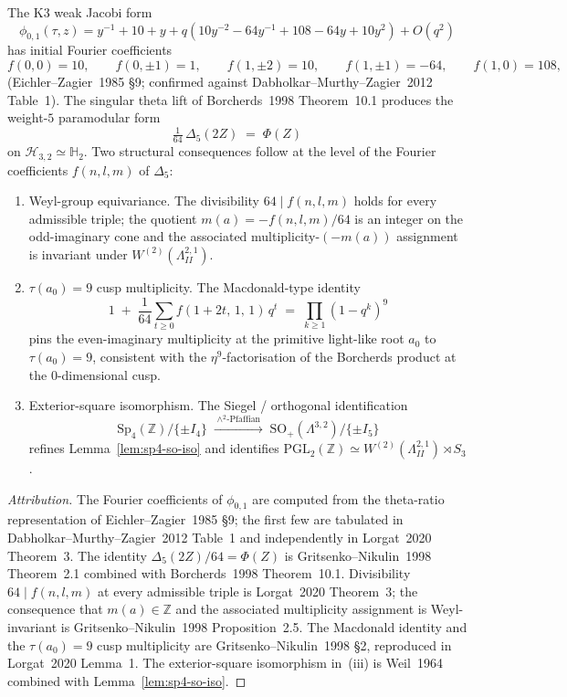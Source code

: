 \begin{theorem}
\label{thm:plat-borcherds-lift}
The K3 weak Jacobi form
\[
\phi_{0,1}(\tau, z)
= y^{-1} + 10 + y
+ q(10y^{-2}-64y^{-1}+108-64y+10y^2)+O(q^2)
\]
has initial Fourier coefficients
\[
 f(0, 0) = 10, \qquad f(0, \pm 1) = 1, \qquad f(1, \pm 2) = 10, \qquad f(1, \pm 1) = -64, \qquad f(1, 0) = 108,
\]
(Eichler--Zagier~1985 \S9; confirmed against Dabholkar--Murthy--Zagier~2012 Table~1). The singular theta lift of Borcherds~1998 Theorem~10.1 produces the weight-$5$ paramodular form
\[
 \tfrac{1}{64}\,\Delta_5(2Z) \;=\; \Phi(Z)
\]
on $\mathcal{H}_{3, 2} \simeq \mathbb{H}_2$. Two structural consequences follow at the level of the Fourier coefficients $f(n, l, m)$ of $\Delta_5$:
\begin{enumerate}[label=\textup{(\roman*)}]
\item \textup{Weyl-group equivariance.} The divisibility $64 \mid f(n, l, m)$ holds for every admissible triple; the quotient $m(a) = -f(n, l, m)/64$ is an integer on the odd-imaginary cone and the associated multiplicity-$(-m(a))$ assignment is invariant under $W^{(2)}(\Lambda^{2,1}_{II})$.
\item \textup{$\tau(a_0) = 9$ cusp multiplicity.} The Macdonald-type identity
\[
 1 \;+\; \frac{1}{64}\sum_{t \geq 0} f(1 + 2t,\, 1,\, 1)\, q^t \;=\; \prod_{k \geq 1}(1 - q^k)^{9}
\]
pins the even-imaginary multiplicity at the primitive light-like root $a_0$ to $\tau(a_0) = 9$, consistent with the $\eta^9$-factorisation of the Borcherds product at the $0$-dimensional cusp.
\item \textup{Exterior-square isomorphism.} The Siegel / orthogonal identification
\[
 \mathrm{Sp}_4(\mathbb{Z}) / \{\pm I_4\} \;\xrightarrow{\;\wedge^2\text{-Pfaffian}\;}\; \mathrm{SO}_+(\Lambda^{3, 2})\big/\{\pm I_5\}
\]
refines Lemma~\ref{lem:sp4-so-iso} and identifies $\mathrm{PGL}_2(\mathbb{Z}) \simeq W^{(2)}(\Lambda^{2,1}_{II}) \rtimes S_3$.
\end{enumerate}
\end{theorem}

\begin{proof}[Attribution]
The Fourier coefficients of $\phi_{0,1}$ are computed from the theta-ratio representation of Eichler--Zagier~1985 \S9; the first few are tabulated in Dabholkar--Murthy--Zagier~2012 Table~1 and independently in Lorgat~2020 Theorem~$3$. The identity $\Delta_5(2Z)/64 = \Phi(Z)$ is Gritsenko--Nikulin~1998 Theorem~2.1 combined with Borcherds~1998 Theorem~10.1. Divisibility $64 \mid f(n, l, m)$ at every admissible triple is Lorgat~2020 Theorem~$3$; the consequence that $m(a) \in \mathbb{Z}$ and the associated multiplicity assignment is Weyl-invariant is Gritsenko--Nikulin~1998 Proposition~2.5. The Macdonald identity and the $\tau(a_0) = 9$ cusp multiplicity are Gritsenko--Nikulin~1998 \S2, reproduced in Lorgat~2020 Lemma~1. The exterior-square isomorphism in~(iii) is Weil~1964 combined with Lemma~\ref{lem:sp4-so-iso}.
\end{proof}

